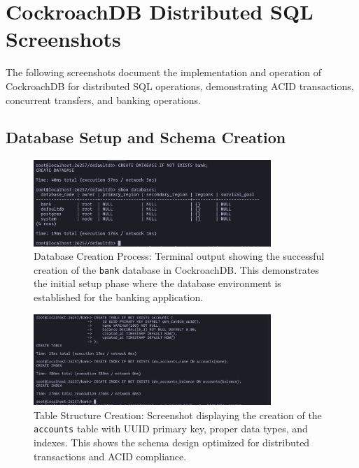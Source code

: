 \section{CockroachDB Distributed SQL Screenshots}

The following screenshots document the implementation and operation of CockroachDB for distributed SQL operations, demonstrating ACID transactions, concurrent transfers, and banking operations.

\subsection*{Database Setup and Schema Creation}

\begin{figure}[H]
  \centering
  \includegraphics[width=0.8\textwidth]{task-5/screenshots/create-db.png}
  \caption{Database Creation Process: Terminal output showing the successful creation of the \texttt{bank} database in CockroachDB. This demonstrates the initial setup phase where the database environment is established for the banking application.}
  \label{fig:task5-create-db}
\end{figure}

\begin{figure}[H]
  \centering
  \includegraphics[width=0.8\textwidth]{task-5/screenshots/create-table.png}
  \caption{Table Structure Creation: Screenshot displaying the creation of the \texttt{accounts} table with UUID primary key, proper data types, and indexes. This shows the schema design optimized for distributed transactions and ACID compliance.}
  \label{fig:task5-create-table}
\end{figure}

